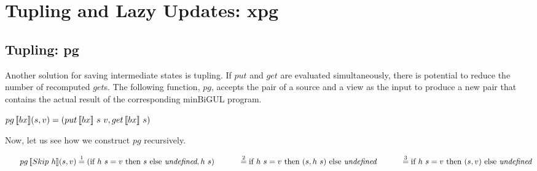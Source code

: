 \section{Tupling and Lazy Updates: xpg} \label{sect:xpg}
\subsection{Tupling: pg} \label{sect:pg}

Another solution for saving intermediate states is tupling. If $put$ and $get$ are evaluated simultaneously, there is potential to reduce the number of recomputed $get$s. The following function, $pg$, accepts the pair of a source and a view as the input to produce a new pair that contains the actual result of the corresponding minBiGUL program.

\begin{definition}
    $pg \, [\![bx]\!] (s, v) = (put \, [\![bx]\!] \ s \ v, get \, [\![bx]\!] \ s)$
\end{definition}



\noindent Now, let us see how we construct $pg$ recursively.

    \noindent $\tabs{2} \pg{Skip \ h}{s}{v} \overset{1}{=} (\sif{h \ s = v}{s}{\textit{undefined}}, h \ s) \\
        \tab \qtab \overset{2}{=} \sif{h \ s = v}{(s, h \ s)}{\textit{undefined}} \\
        \tab \qtab \overset{3}{=} \sif{h \ s = v}{(s, v)}{\textit{undefined}}$
        
